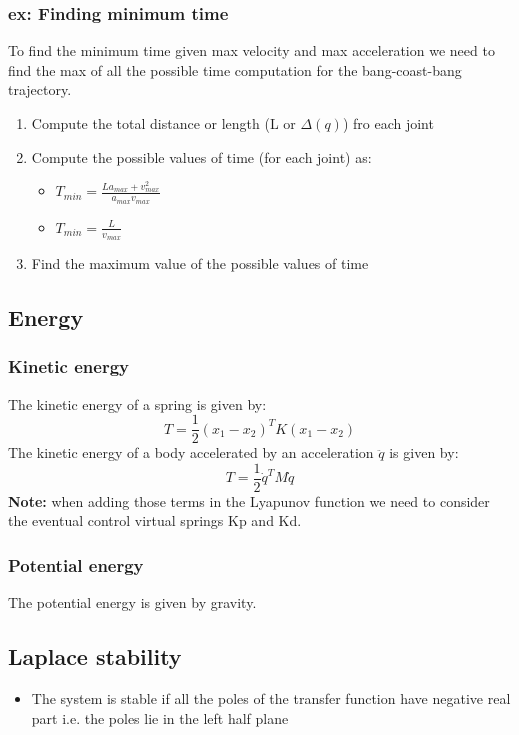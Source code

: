 \documentclass[a4paper,12pt]{article}
\begin{document}
\subsubsection{ex: Finding minimum time}
To find the minimum time given max velocity and max acceleration we need to find the max 
of all the possible time computation for the bang-coast-bang trajectory.
\begin{enumerate}
    \item Compute the total distance or length (L or $\Delta(q)$) fro each joint
    \item Compute the possible values of time (for each joint) as: \begin{itemize}
        \item $
            T_{min} = \frac{La_{max}+v^2_{max}}{a_{max}v_{max}}$
        \item $
            T_{min} = \frac{L}{v_{max}}$
    \end{itemize}
    \item Find the maximum value of the possible values of time
\end{enumerate}
\subsection{Energy}
\subsubsection{Kinetic energy}
The kinetic energy of a spring is given by:
\begin{equation}
    T = \frac{1}{2} (x_1-x_2)^T K (x_1-x_2)
\end{equation}
The kinetic energy of a body accelerated by an acceleration $\ddot{q}$
is given by:
\begin{equation}
    T = \frac{1}{2} \dot{q}^T M \dot{q}
\end{equation}
\textbf{Note:} when adding those terms in 
the Lyapunov function we need to consider the
eventual control virtual springs Kp and Kd.

\subsubsection{Potential energy}
The potential energy is given by gravity.

\subsection{Laplace stability}
\begin{itemize}
    \item The system is stable if all the poles of the 
    transfer function have negative real part i.e. the poles lie in the 
    left half plane
\end{itemize}
\end{document}
